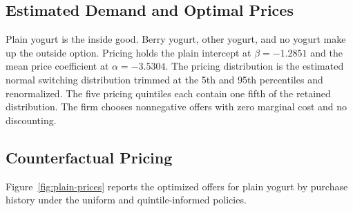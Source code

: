\documentclass[12pt]{article}
\theoremstyle{definition}
\theoremstyle{remark}
\begin{document}
\subsection{Estimated Demand and Optimal Prices}
Plain yogurt is the inside good. Berry yogurt, other yogurt, and no yogurt
make up the outside option. Pricing holds the plain intercept at
$\beta=-1.2851$ and the mean price coefficient at $\alpha=-3.5304$.
The pricing distribution is the estimated normal switching distribution
trimmed at the 5th and 95th percentiles and renormalized. The five pricing
quintiles each contain one fifth of the retained distribution. The firm
chooses nonnegative offers with zero marginal cost and no discounting.

%

\subsection{Counterfactual Pricing}
Figure~\ref{fig:plain-prices} reports the optimized offers for plain yogurt
by purchase history under the uniform and quintile-informed policies.
\end{document}
